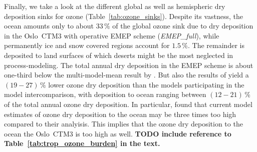\documentclass[gmd, manuscript]{copernicus}
\begin{document}
Finally, we take a look at the different global as well as hemispheric dry deposition sinks for ozone (Table~\ref{tab:ozone_sinks}). Despite its vastness, the ocean amounts only to about $33\,\unit{\%}$ of the global ozone sink due to dry deposition in the Oslo~CTM3 with operative EMEP scheme (\emph{EMEP\_full}), while permanently ice and snow covered regions account for $1.5\,\unit{\%}$. The remainder is deposited to land surfaces of which deserts might be the most neglected in process-modeling. The total annual dry deposition in the EMEP scheme is about one-third below the multi-model-mean result by \citet{ACP:Hardacre2015}. But also the results of \citet{ACP:Luhar2017, ACP:Luhar2018} yield a $(19-27)\,\unit{\%}$ lower ozone dry deposition than the models participating in the model intercomparison, with deposition to ocean ranging between $(12-21)\,\unit{\%}$ of the total annual ozone dry deposition. In particular, \citet{ACP:Luhar2018} found that current model estimates of ozone dry deposition to the ocean may be three times too high compared to their analyisis. This implies that the ozone dry deposition to the ocean the Oslo~CTM3 is too high as well. {\bf TODO include reference to Table~\ref{tab:trop_ozone_burden} in the text.}
%
\end{document}
